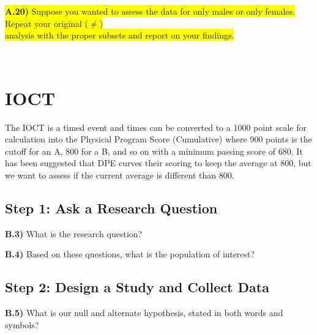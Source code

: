 \documentclass{article}
\newif\ifPrintSolution
\newcommand{\sol}[1]{\ifPrintSolution {\color{blue} #1 } \fi}
\begin{document}
\vspace{0.75in}


\colorbox{yellow}{\textbf{A.20)} Suppose you wanted to assess the data for only males or only females. Repeat your original ($\ne$) }\\\colorbox{yellow}{analysis with the proper subsets and report on your findings.}

\sol{MALES: $t = \frac{301 - 270}{\frac{28.6}{\sqrt{234}}}$ = 16.58073, p-value $\approx$ 0}\\
\sol{FEMALES: $t = \frac{313 - 270}{\frac{29.4}{\sqrt{59}}}$ = 11.23433, p-value = 2.22e$^{-16}$}

\pagebreak

\section*{IOCT}

The IOCT is a timed event and times can be converted to a 1000 point scale for calculation into the Physical Program Score (Cumulative) where 900 points is the cutoff for an A, 800 for a B, and so on with a minimum passing score of 680. It has been suggested that DPE curves their scoring to keep the average at 800, but we want to assess if the current average is different than 800.

\subsection*{Step 1: Ask a Research Question}

\textbf{B.3)} What is the research question?

\sol{Is the Corps of Cadets average IOCT score equal to 800 or not?}

\vspace{0.25in}

\textbf{B.4)} Based on these questions, what is the population of interest?

\sol{The population of interest is the Corps of Cadets}

\vspace{0.1in}

\subsection*{Step 2: Design a Study and Collect Data}

\textbf{B.5)} What is our null and alternate hypothesis, stated in both words and symbols?
\end{document}
